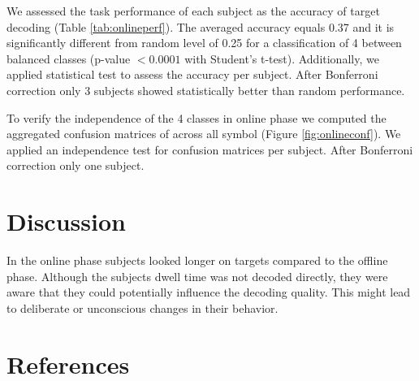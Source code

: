 \documentclass[12pt]{iopart}
\begin{document}
We assessed the task performance of each subject as the accuracy of
target decoding (Table \ref{tab:onlineperf}). The averaged accuracy 
equals 0.37 and it is significantly different from random level of 0.25 for
a classification of 4 between balanced classes (p-value $< 0.0001$ with Student's t-test).
Additionally, we applied statistical test to assess the accuracy per subject.
After Bonferroni correction only 3 subjects showed statistically better than random performance.

To verify the independence of the 4 classes in online phase
we computed the aggregated confusion matrices of across all symbol (Figure \ref{fig:onlineconf}).
We applied an independence test for confusion matrices per subject.
After Bonferroni correction only one subject.


\section{Discussion}
\label{sec:discussion}

In the online phase subjects looked longer on targets compared to the offline phase.
Although the subjects dwell time was not decoded directly, they were aware
that they could potentially influence the decoding quality. This might
lead to deliberate or unconscious changes in their behavior.


\section*{References}



\end{document}

